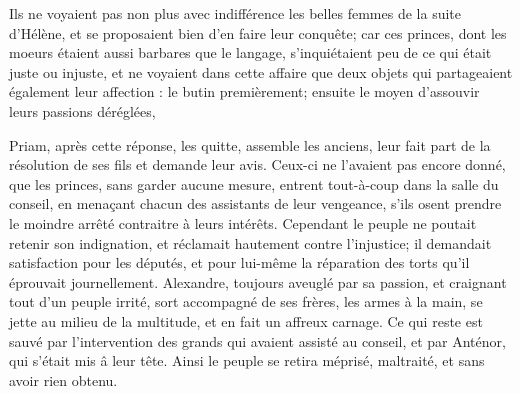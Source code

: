 \documentclass{article}
\begin{document}
 Ils ne voyaient pas non plus avec indifférence les belles femmes de la suite d'Hélène, et se proposaient bien d'en faire leur conquête; car ces princes, dont les moeurs étaient aussi barbares que le langage, s'inquiétaient peu de ce qui était juste ou injuste, et ne voyaient dans cette affaire que deux objets qui partageaient également leur affection : le butin premièrement; ensuite le moyen d'assouvir leurs passions déréglées,

Priam, après cette réponse, les quitte, assemble les anciens, leur fait part de la résolution de ses fils et demande leur avis. Ceux-ci ne l'avaient pas encore donné, que les princes, sans garder aucune mesure, entrent tout-à-coup dans la salle du conseil, en menaçant chacun des assistants de leur vengeance, s'ils osent prendre le moindre arrêté contraitre à leurs intérêts. Cependant le peuple ne poutait retenir son indignation, et réclamait hautement contre l'injustice; il demandait satisfaction pour les députés, et pour lui-même la réparation des torts qu'il éprouvait journellement. Alexandre, toujours aveuglé par sa passion, et craignant tout d'un peuple irrité, sort accompagné de ses frères, les armes à la main, se jette au milieu de la multitude, et en fait un affreux carnage. Ce qui reste est sauvé par l'intervention des grands qui avaient assisté au conseil, et par Anténor, qui s'était mis â leur tête. Ainsi le peuple se retira méprisé, maltraité, et sans avoir rien obtenu.
\end{document}
